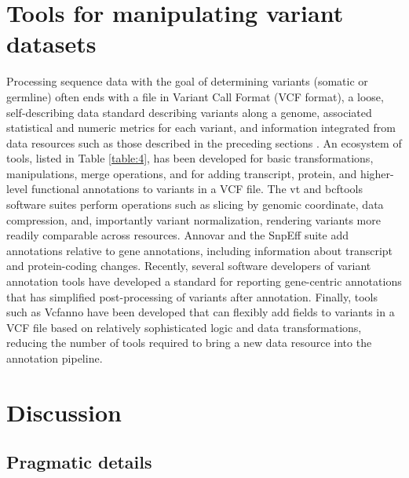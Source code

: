 \documentclass{article}
\begin{document}
\section{Tools for manipulating variant datasets}

 

Processing sequence data with the goal of determining variants
(somatic or germline) often ends with a file in Variant Call Format
(VCF format), a loose, self-describing data standard describing
variants along a genome, associated statistical and numeric metrics
for each variant, and information integrated from data resources such
as those described in the preceding sections \parencite{Danecek2011-du}. An
ecosystem of tools, listed in Table \ref{table:4}, has been developed for basic
transformations, manipulations, merge operations, and for adding
transcript, protein, and higher-level functional annotations to
variants in a VCF file. The vt and bcftools software suites perform
operations such as slicing by genomic coordinate, data compression,
and, importantly variant normalization, rendering variants more
readily comparable across resources. Annovar
\parencite{Yang2015-bg,Wang2010-bt} and the SnpEff suite
\parencite{Cingolani2012-pt} add annotations relative to gene annotations,
including information about transcript and protein-coding
changes. Recently, several software developers of variant annotation
tools have developed a standard for reporting gene-centric annotations
that has simplified post-processing of variants after
annotation. Finally, tools such as Vcfanno \parencite{Pedersen2016-pu} have
been developed that can flexibly add fields to variants in a VCF file
based on relatively sophisticated logic and data transformations,
reducing the number of tools required to bring a new data resource
into the annotation pipeline.


\section{Discussion}

\subsection{Pragmatic details}
\end{document}
